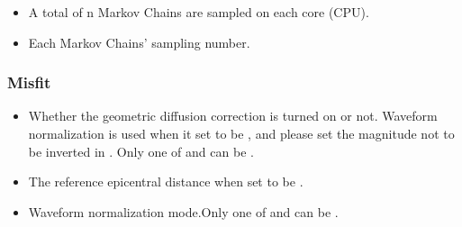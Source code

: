 \documentclass[a4paper,10pt,english,openany]{sphinxmanual}
\begin{document}
\begin{itemize}
\item {} 
A total of n Markov Chains are sampled on each core (CPU).

\end{itemize}

\begin{itemize}
\item {} 
Each Markov Chains’ sampling number.

\end{itemize}


\subsubsection{Misfit}
\label{\detokenize{tutorials/S4_Inv_DC:misfit}}
\begin{itemize}
\item {} 
Whether the geometric diffusion correction is turned on or not. Waveform normalization is used when
it set to be , and please set the magnitude  not to be inverted in .
Only one of  and  can be .

\end{itemize}

\begin{itemize}
\item {} 
The reference epicentral distance when  set to be .

\end{itemize}

\begin{itemize}
\item {} 
Waveform normalization mode.Only one of  and
 can be .

\end{itemize}
\end{document}
